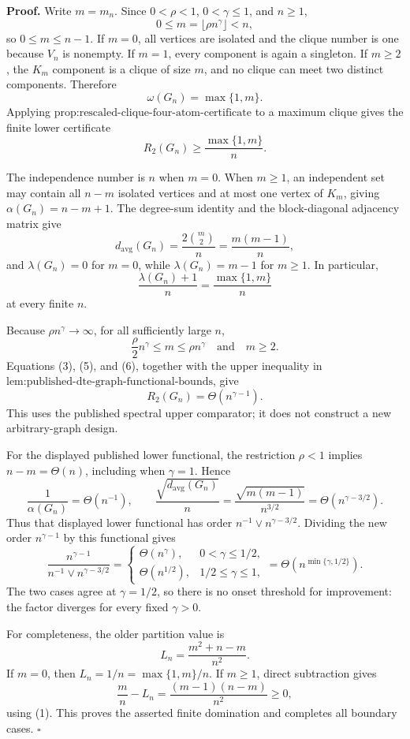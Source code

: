 \textbf{Proof.}
Write \(m=m_n\).  Since \(0<\rho<1\), \(0<\gamma\leq1\), and \(n\geq1\),
\[
0\leq m=\lfloor\rho n^{\gamma}\rfloor<n,
\tag{1}
\]
so \(0\leq m\leq n-1\).  If \(m=0\), all vertices are isolated and the clique number is one because \(V_n\) is nonempty.  If \(m=1\), every component is again a singleton.  If \(m\geq2\), the \(K_m\) component is a clique of size \(m\), and no clique can meet two distinct components.  Therefore
\[
\omega(G_n)=\max\{1,m\}.
\tag{2}
\]
Applying \(\text{prop:rescaled-clique-four-atom-certificate}\) to a maximum clique gives the finite lower certificate
\[
R_2(G_n)\geq\frac{\max\{1,m\}}n.
\tag{3}
\]

The independence number is \(n\) when \(m=0\).  When \(m\geq1\), an independent set may contain all \(n-m\) isolated vertices and at most one vertex of \(K_m\), giving \(\alpha(G_n)=n-m+1\).  The degree-sum identity and the block-diagonal adjacency matrix give
\[
d_{\mathrm{avg}}(G_n)=\frac{2\binom m2}{n}=\frac{m(m-1)}n,
\tag{4}
\]
and \(\lambda(G_n)=0\) for \(m=0\), while \(\lambda(G_n)=m-1\) for \(m\geq1\).  In particular,
\[
\frac{\lambda(G_n)+1}{n}=\frac{\max\{1,m\}}n
\tag{5}
\]
at every finite \(n\).

Because \(\rho n^{\gamma}\to\infty\), for all sufficiently large \(n\),
\[
\frac{\rho}{2}n^{\gamma}\leq m\leq\rho n^{\gamma}
\quad\text{and}\quad m\geq2.
\tag{6}
\]
Equations (3), (5), and (6), together with the upper inequality in \(\text{lem:published-dte-graph-functional-bounds}\), give
\[
R_2(G_n)=\Theta(n^{\gamma-1}).
\tag{7}
\]
This uses the published spectral upper comparator; it does not construct a new arbitrary-graph design.

For the displayed published lower functional, the restriction \(\rho<1\) implies \(n-m=\Theta(n)\), including when \(\gamma=1\).  Hence
\[
\frac1{\alpha(G_n)}=\Theta(n^{-1}),
\qquad
\frac{\sqrt{d_{\mathrm{avg}}(G_n)}}n
=\frac{\sqrt{m(m-1)}}{n^{3/2}}
=\Theta(n^{\gamma-3/2}).
\tag{8}
\]
Thus that displayed lower functional has order \(n^{-1}\vee n^{\gamma-3/2}\).  Dividing the new order \(n^{\gamma-1}\) by this functional gives
\[
\frac{n^{\gamma-1}}{n^{-1}\vee n^{\gamma-3/2}}
=
\begin{cases}
\Theta(n^{\gamma}),&0<\gamma\leq1/2,\\
\Theta(n^{1/2}),&1/2\leq\gamma\leq1,
\end{cases}
=\Theta\!\left(n^{\min\{\gamma,1/2\}}\right).
\tag{9}
\]
The two cases agree at \(\gamma=1/2\), so there is no onset threshold for improvement: the factor diverges for every fixed \(\gamma>0\).

For completeness, the older partition value is
\[
L_n=\frac{m^2+n-m}{n^2}.
\tag{10}
\]
If \(m=0\), then \(L_n=1/n=\max\{1,m\}/n\).  If \(m\geq1\), direct subtraction gives
\[
\frac mn-L_n
=\frac{(m-1)(n-m)}{n^2}\geq0,
\tag{11}
\]
using (1).  This proves the asserted finite domination and completes all boundary cases. \(\square\)